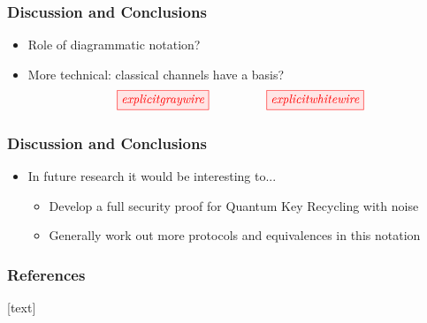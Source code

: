 \documentclass[]{beamer}
\begin{document}
\begin{frame}
	\frametitle{Discussion and Conclusions}
	\begin{itemize}
	\item Role of diagrammatic notation?
	\item More technical: classical channels have a basis?
	\begin{equation}
	\tikzfig{explicitgraywire} ~~~~~~~~~~~~~~ \tikzfig{explicitwhitewire}
	\end{equation}
	\end{itemize}
\end{frame}

\begin{frame}
	\frametitle{Discussion and Conclusions}
	\begin{itemize}
		\item In future research it would be interesting to...
		\begin{itemize}
			\item Develop a full security proof for Quantum Key Recycling with noise
			\item Generally work out more protocols and equivalences in this notation
		\end{itemize}
	\end{itemize}
\end{frame}

\begin{frame}
		\centering 
		\Huge
\end{frame}
\begin{frame}[shrink=1]
	\frametitle{References}
[text]
	
	
\end{frame}
\end{document}
